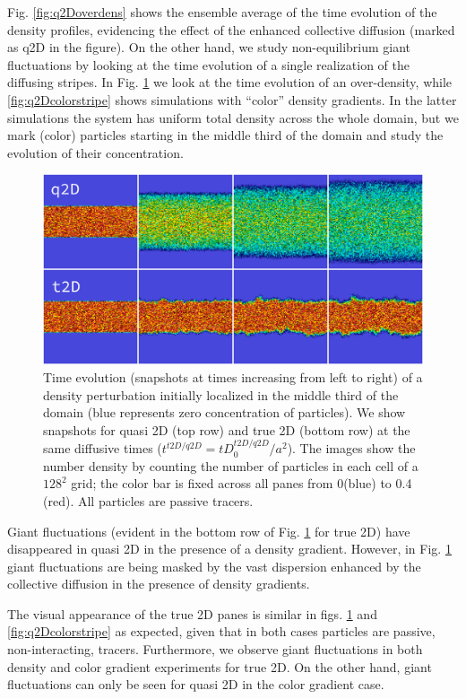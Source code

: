 \documentclass[ twoside,openright,titlepage,numbers=noenddot,%
headinclude,footinclude,cleardoublepage=empty,abstract=on,
BCOR=5mm,paper=b5,fontsize=11pt, dvipsnames
]{scrreprt}
\begin{document}
Fig. \ref{fig:q2Doverdens} shows the ensemble average of the time evolution of the density profiles, evidencing the effect of the enhanced collective diffusion (marked as q2D in the figure).
On the other hand, we study non-equilibrium giant fluctuations by looking at the time evolution of a single realization of the diffusing stripes. In Fig. \ref{fig:q2Dstripes} we look at the time evolution of an over-density, while \ref{fig:q2Dcolorstripe} shows simulations with ``color'' density gradients. In the latter simulations the system has uniform total density across the whole domain, but we mark (color) particles starting in the middle third of the domain and study the evolution of their concentration.
\begin{figure}[H]
  \centering
  \includegraphics[width=\linewidth]{gfx/q2Dstripes}
  \caption{Time evolution (snapshots at times increasing from left to right) of a density perturbation initially localized in the middle third of the domain (blue represents zero concentration of particles). We show snapshots for quasi 2D (top row) and true 2D (bottom row) at the same diffusive times ($t^{t2D/q2D}= tD_0^{t2D/q2D}/a^2$). The images show the number density by counting the number of particles in each cell of a $128^2$ grid; the color bar is fixed across all panes from 0(blue) to 0.4 (red). All particles are passive tracers.}
  \label{fig:q2Dstripes}
\end{figure}
Giant fluctuations (evident in the bottom row of Fig. \ref{fig:q2Dstripes} for true 2D) have disappeared in quasi 2D in the presence of a density gradient. However, in Fig. \ref{fig:q2Dstripes} giant fluctuations are being masked by the vast dispersion enhanced by the collective diffusion in the presence of density gradients.

The visual appearance of the true 2D panes is similar in figs. \ref{fig:q2Dstripes} and \ref{fig:q2Dcolorstripe} as expected, given that in both cases particles are passive, non-interacting, tracers. Furthermore, we observe giant fluctuations in both density and color gradient experiments for true 2D. On the other hand, giant fluctuations can only be seen for quasi 2D in the color gradient case.
\end{document}
